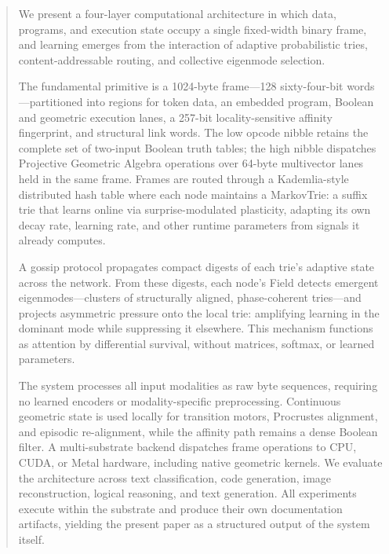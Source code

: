 \begin{abstract}
We present a four-layer computational architecture in which data,
programs, and execution state occupy a single fixed-width binary frame,
and learning emerges from the interaction of adaptive probabilistic
tries, content-addressable routing, and collective eigenmode selection.

The fundamental primitive is a 1024-byte frame---128 sixty-four-bit
words---partitioned into regions for token data, an embedded program,
Boolean and geometric execution lanes, a 257-bit locality-sensitive
affinity fingerprint, and structural link words.  The low opcode nibble
retains the complete set of two-input Boolean truth tables; the high
nibble dispatches Projective Geometric Algebra operations over 64-byte
multivector lanes held in the same frame.  Frames are routed through a
Kademlia-style distributed hash table where
each node maintains a MarkovTrie: a suffix trie that learns online via
surprise-modulated plasticity, adapting its own decay rate, learning
rate, and other runtime parameters from signals it already computes.

A gossip protocol propagates compact digests of each trie's adaptive
state across the network.  From these digests, each node's Field
detects emergent eigenmodes---clusters of structurally aligned,
phase-coherent tries---and projects asymmetric pressure onto the local
trie: amplifying learning in the dominant mode while suppressing it
elsewhere.  This mechanism functions as attention by differential
survival, without matrices, softmax, or learned parameters.

The system processes all input modalities as raw byte sequences,
requiring no learned encoders or modality-specific preprocessing.
Continuous geometric state is used locally for transition motors,
Procrustes alignment, and episodic re-alignment, while the affinity
path remains a dense Boolean filter.  A multi-substrate backend
dispatches frame operations to CPU, CUDA, or Metal hardware, including
native geometric kernels.  We evaluate the architecture across text
classification, code generation, image reconstruction, logical
reasoning, and text generation.  All experiments execute within the
substrate and produce their own documentation artifacts, yielding the
present paper as a structured output of the system itself.
\end{abstract}
